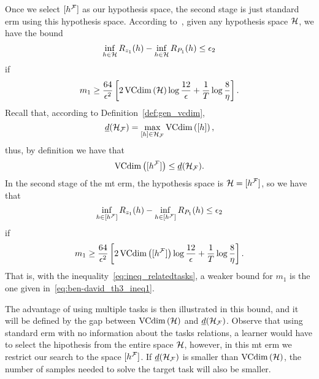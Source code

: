 Once we select $\lbrack h^{\mathcal{F}}\rbrack$ as our hypothesis space, the second stage is just standard \acrshort{erm} using this hypothesis space.
%
According to~\cite{vapnik1982estimation}, given any hypothesis space $\mathcal{H}$, we have the bound
\begin{equation}\nonumber
    \inf_{h \in \mathcal{H}} R_{z_1}(h) - \inf_{h \in \mathcal{H}} R_{P_1}(h) \leq \epsilon_2
\end{equation}
if
\begin{equation}
    \nonumber
    m_1 \geq  \frac{64}{\epsilon^2} \left[2 \operatorname{VCdim}\left(\mathcal{H}\right) \log \frac{12}{\epsilon} + \frac{1}{T}\log\frac{8}{\eta} \right] .
\end{equation}
Recall that, according to Definition~\ref{def:gen_vcdim}, 
$$ \underline{d}(\mathcal{H}_{\mathcal{F}}) = \max_{\lbrack h\rbrack \in \mathcal{H}_{\mathcal{F}}} \operatorname{VCdim}\left(\lbrack h\rbrack\right), $$
thus, by definition we have that
\begin{equation}
    \label{eq:ineq_relatedtasks}
    \vcdim{\equivclass{\hypf^\frelset}} \leq \underline{d}(\hypspace_\frelset) .
\end{equation}
In the second stage of the \acrshort{mt} \acrshort{erm}, the hypothesis space is $\mathcal{H} = \lbrack h^{\mathcal{F}}\rbrack$, so we have that 
\begin{equation}\nonumber
    \inf_{h \in \lbrack h^{\mathcal{F}}\rbrack} R_{z_1}(h) - \inf_{h \in \lbrack h^{\mathcal{F}}\rbrack} R_{P_1}(h) \leq \epsilon_2
\end{equation}
if
\begin{equation}
    \nonumber
    m_1 \geq  \frac{64}{\epsilon^2} \left[2 \operatorname{VCdim}\left(\lbrack h^{\mathcal{F}}\rbrack\right) \log \frac{12}{\epsilon} + \frac{1}{T}\log\frac{8}{\eta} \right] .
\end{equation}
That is, with the inequality~\eqref{eq:ineq_relatedtasks}, a weaker bound for $m_1$ is the one given in~\eqref{eq:ben-david_th3_ineq1}.

%
The advantage of using multiple tasks is then illustrated in this bound, and it will be defined by the gap between $\operatorname{VCdim}\left(\mathcal{H}\right)$ and $\underline{d}(\mathcal{H}_{\mathcal{F}})$. 
Observe that using standard \acrshort{erm} with no information about the tasks relations, a learner would have to select the hipothesis from the entire space $\mathcal{H}$, however, in this \acrshort{mt} \acrshort{erm} we restrict our search to the space $\lbrack h^{\mathcal{F}}\rbrack$.
If $\underline{d}(\mathcal{H}_{\mathcal{F}})$ is smaller than $\operatorname{VCdim}\left(\mathcal{H}\right)$, the number of samples needed to solve the target task will also be smaller.


